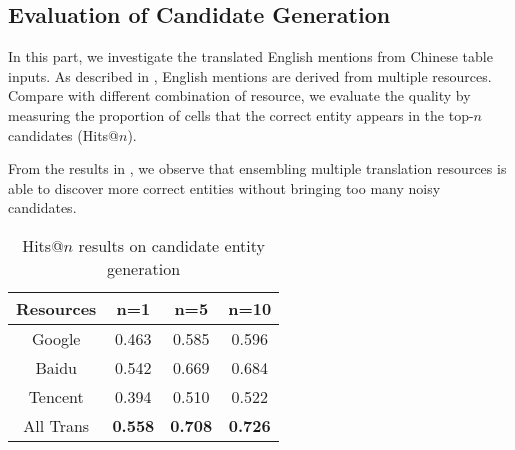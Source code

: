 \subsection{Evaluation of Candidate Generation}
\label{sec:exp-cand-gen-eval}


In this part, we investigate the translated English mentions from Chinese table inputs.
As described in , English mentions are derived from multiple resources.
Compare with different combination of resource, we evaluate the quality by
measuring the proportion of cells that the correct entity appears in the top-$n$ candidates
(Hits@$n$).

From the results in , we observe that
ensembling multiple translation resources is able to discover more correct entities without bringing too many noisy candidates.

\begin{table}[ht]
    \small
    \centering
    \caption{Hits@$n$ results on candidate entity generation}
    \label{tab:cand-gen-quality}
    \begin{tabular} {c|ccc}
        \hline
        Resources   &   n=1     &   n=5     &   n=10    \\
        \hline
        Google      &   0.463   &   0.585   &   0.596   \\
        Baidu       &   0.542   &   0.669   &   0.684   \\
        Tencent     &   0.394   &   0.510   &   0.522   \\
        \hline
        All Trans & \textbf{0.558}  & \textbf{0.708}  &  \textbf{0.726}   \\
        \hline
    \end{tabular}
\end{table}


